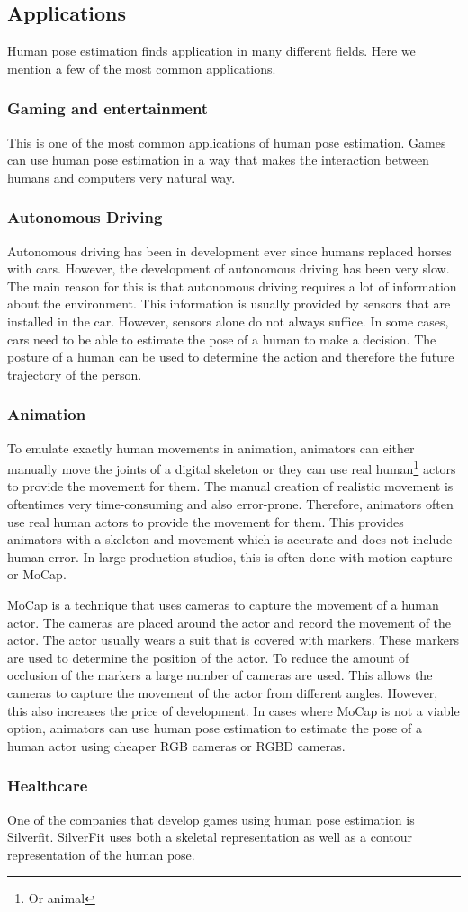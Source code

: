 \subsection{Applications}

Human pose estimation finds application in many different fields. Here we mention a few of the most common applications.

\subsubsection{Gaming and entertainment}

This is one of the most common applications of human pose estimation. Games can use human pose estimation in a way that makes the interaction between humans and computers very natural way.

\subsubsection{Autonomous Driving}

Autonomous driving has been in development ever since humans replaced horses with cars. However, the development of autonomous driving has been very slow. The main reason for this is that autonomous driving requires a lot of information about the environment. This information is usually provided by sensors that are installed in the car. However, sensors alone do not always suffice. In some cases, cars need to be able to estimate the pose of a human to make a decision. The posture of a human can be used to determine the action and therefore the future trajectory of the person. 

\subsubsection{Animation}

To emulate exactly human movements in animation, animators can either manually move the joints of a digital skeleton or they can use real human\footnote{Or animal} actors to provide the movement for them. The manual creation of realistic movement is oftentimes very time-consuming and also error-prone. Therefore, animators often use real human actors to provide the movement for them. This provides animators with a skeleton and movement which is accurate and does not include human error. In large production studios, this is often done with motion capture or MoCap. 

MoCap is a technique that uses cameras to capture the movement of a human actor. The cameras are placed around the actor and record the movement of the actor. The actor usually wears a suit that is covered with markers. These markers are used to determine the position of the actor. To reduce the amount of occlusion of the markers a large number of cameras are used. This allows the cameras to capture the movement of the actor from different angles. However, this also increases the price of development. In cases where MoCap is not a viable option, animators can use human pose estimation to estimate the pose of a human actor using cheaper RGB cameras or RGBD cameras.

\subsubsection{Healthcare}

One of the companies that develop games using human pose estimation is Silverfit. SilverFit uses both a skeletal representation as well as a contour representation of the human pose. 